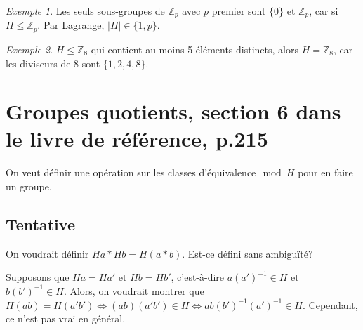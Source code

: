 \documentclass{report}
\newcommand*{\card}[1]{\left| #1 \right|}
\newcommand*{\lte}{\leqslant}
\newcommand*{\entiers}{\mathbb{Z}}
\theoremstyle{definition}
\theoremstyle{remark}
\newtheorem*{exem}{Exemple}
\begin{document}
	\begin{exem}
		Les seuls sous-groupes de $\entiers_p$ avec $p$ premier sont $\{\overline0\}$ et $\entiers_p$, car si $H \lte \entiers_p$. Par Lagrange, $\card{H} \in \{1,p\}$.
	\end{exem}
	\begin{exem}
		$H \lte \entiers_8$ qui contient au moins 5 \'el\'ements distincts, alors $H = \entiers_8$, car les diviseurs de 8 sont $\{1,2,4,8\}$.
	\end{exem}

	\section[Groupes quotients]{Groupes quotients, section 6 dans le livre de r\'ef\'erence, p.215}
	On veut d\'efinir une op\'eration sur les classes d'\'equivalence$\mod H$ pour en faire un groupe.

	\subsection*{Tentative}
	On voudrait d\'efinir $Ha*Hb=H(a*b)$. Est-ce d\'efini sans ambigu\"it\'e?

	Supposons que $Ha=Ha'$ et $Hb=Hb'$, c'est-\`a-dire $a(a')^{-1} \in H$ et $b(b')^{-1} \in H$. Alors, on voudrait montrer que $H(ab) = H(a'b') \Leftrightarrow (ab)(a'b') \in H \Leftrightarrow ab(b')^{-1}(a')^{-1} \in H$. Cependant, ce n'est pas vrai en g\'en\'eral.
\end{document}
